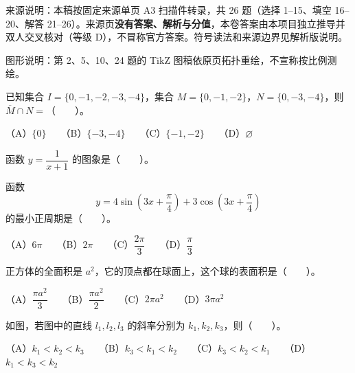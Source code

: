 

\begin{gktip}
来源说明：本稿按固定来源单页 A3 扫描件转录，共 26 题（选择 1–15、填空 16–20、解答 21–26）。来源页\textbf{没有答案、解析与分值}，本卷答案由本项目独立推导并双人交叉核对（等级 D），不冒称官方答案。符号读法和来源边界见解析版说明。

图形说明：第 2、5、10、24 题的 TikZ 图稿依原页拓扑重绘，不宣称按比例测绘。
\end{gktip}

\begin{question}
已知集合 $I=\{0,-1,-2,-3,-4\}$，集合 $M=\{0,-1,-2\}$，$N=\{0,-3,-4\}$，则 $\overline{M}\cap N=$\mbox{（　　）}。

（A）$\{0\}$　　（B）$\{-3,-4\}$　　（C）$\{-1,-2\}$　　（D）$\varnothing$

\Needspace{0.4\textheight}
\end{question}
\begin{question}
函数 $y=\dfrac{1}{x+1}$ 的图象是\mbox{（　　）}。
\nopagebreak[4]
\begin{center}\end{center}
\nopagebreak[4]
\end{question}
\begin{question}
函数
\nopagebreak[4]
\[
y=4\sin\left(3x+\frac\pi4\right)+3\cos\left(3x+\frac\pi4\right)
\]
的最小正周期是\mbox{（　　）}。

（A）$6\pi$　　（B）$2\pi$　　（C）$\dfrac{2\pi}{3}$　　（D）$\dfrac\pi3$

\end{question}
\begin{question}
正方体的全面积是 $a^2$，它的顶点都在球面上，这个球的表面积是\mbox{（　　）}。

（A）$\dfrac{\pi a^2}{3}$　　（B）$\dfrac{\pi a^2}{2}$　　（C）$2\pi a^2$　　（D）$3\pi a^2$

\Needspace{0.4\textheight}
\end{question}
\begin{question}
如图，若图中的直线 $l_1,l_2,l_3$ 的斜率分别为 $k_1,k_2,k_3$，则\mbox{（　　）}。
\nopagebreak[4]
\begin{center}\end{center}
\nopagebreak[4]
（A）$k_1<k_2<k_3$　　（B）$k_3<k_1<k_2$　　（C）$k_3<k_2<k_1$　　（D）$k_1<k_3<k_2$

\end{question}
